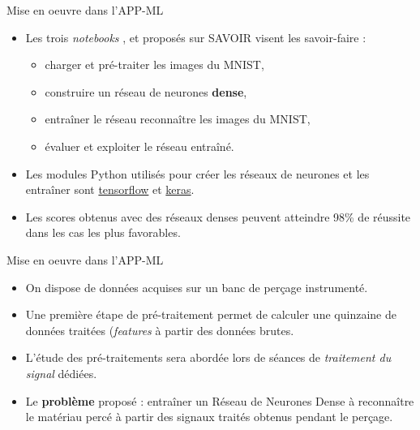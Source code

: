\documentclass[10pt,serif,mathserif,compress,hyperref={colorlinks}]{beamer}
\begin{document}
\begin{frame}{Mise en oeuvre dans l'APP-ML}

  \begin{tcolorbox}[title=Auto-formation]
    \begin{itemize}
    \item Les trois {\em notebooks} ,  et   proposés sur SAVOIR
      visent les savoir-faire :
      \begin{itemize}
      \item charger et pré-traiter les images du MNIST,
      \item construire un réseau de neurones {\bf dense},
      \item entraîner le réseau reconnaître les images du MNIST,
      \item évaluer et exploiter le réseau entraîné.
      \end{itemize}
      
    \item Les modules Python utilisés pour créer les réseaux de neurones et les entraîner sont \href{https://www.tensorflow.org/tutorials}{tensorflow}
      et \href{https://www.tensorflow.org/versions/r2.4/api_docs/python/tf}{keras}.
    \item Les scores obtenus avec des réseaux denses peuvent atteindre 98\% de réussite dans les cas les plus favorables.
    \end{itemize}
  \end{tcolorbox}

\end{frame}

\begin{frame}{Mise en oeuvre dans l'APP-ML}

  \begin{tcolorbox}[title=Résolution d'un problème de classification]
    \begin{itemize}
    \item On dispose de données acquises sur un banc de perçage instrumenté.
    \item Une première étape de pré-traitement permet de calculer une quinzaine de
      données traitées ({\em features} à partir des données brutes.
    \item L'étude des pré-traitements sera abordée lors de séances de {\em traitement du signal} dédiées.
    \item Le \textbf{problème} proposé : entraîner un Réseau de Neurones Dense à reconnaître le matériau percé
      à partir des signaux traités obtenus pendant le perçage.
    \end{itemize}
      
  \end{tcolorbox}

\end{frame}
\end{document}
